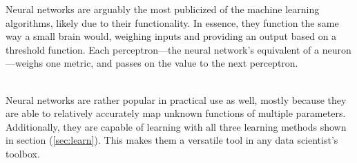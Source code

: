 \documentclass{comjnl}
\numberwithin{equation}{subsection}
\begin{document}
            Neural networks are arguably the most publicized of the machine learning algorithms,
            likely due to their functionality. In essence, they function the same way a small brain
            would, weighing inputs and providing an output based on a threshold function. Each
            perceptron---the neural network's equivalent of a neuron---weighs one metric, and
            passes on the value to the next perceptron.
            \\[0.5cm]
            \\[0.5cm]
            Neural networks are rather popular in practical use as well, mostly because they
            are able to relatively accurately map unknown functions of multiple parameters.
            Additionally, they are capable of learning with all three learning methods shown in
            section (\ref{sec:learn}). This makes them a versatile tool in any data scientist's
            toolbox.
\end{document}
